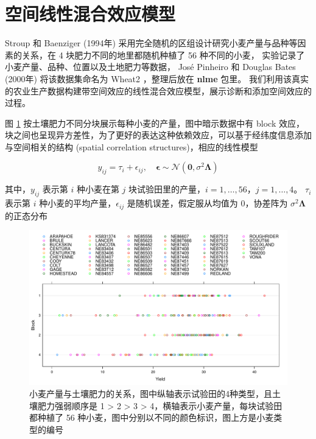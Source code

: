 \documentclass[12pt,a4paper,UTF8,twoside]{book}
\theoremstyle{definition}
\theoremstyle{definition}
\theoremstyle{definition}
\theoremstyle{remark}
\begin{document}
\hypertarget{sptial-random-effects}{%
\section{空间线性混合效应模型}\label{sptial-random-effects}}

Stroup 和 Baenziger (1994年) \citep{Stroup1994}
采用完全随机的区组设计研究小麦产量与品种等因素的关系，在 4
块肥力不同的地里都随机种植了 56 种不同的小麦，
实验记录了小麦产量、品种、位置以及土地肥力等数据， José Pinheiro 和
Douglas Bates (2000年) \citep{Pinheiro2000} 将该数据集命名为 Wheat2
，整理后放在 \textbf{nlme} 包里。
我们利用该真实的农业生产数据构建带空间效应的线性混合效应模型，展示诊断和添加空间效应的过程。

图 \ref{fig:yields-block}
按土壤肥力不同分块展示每种小麦的产量，图中暗示数据中有 block
效应，块之间也呈现异方差性，为了更好的表达这种依赖效应，可以基于经纬度信息添加与空间相关的结构
(spatial correlation structures)，相应的线性模型

\begin{equation}
y_{ij} = \tau_i + \epsilon_{ij}, \quad \boldsymbol{\epsilon} \sim \mathcal{N}(\mathbf{0},\sigma^2 \boldsymbol{\Lambda}) \label{eq:extended-linear-model}
\end{equation}

其中，\(y_{ij}\) 表示第 \(i\) 种小麦在第 \(j\)
块试验田里的产量，\(i = 1,\ldots,56\)，\(j = 1,\ldots,4\)。 \(\tau_i\)
表示第 \(i\) 种小麦的平均产量，\(\epsilon_{ij}\)
是随机误差，假定服从均值为 0，协差阵为 \(\sigma^2 \boldsymbol{\Lambda}\)
的正态分布

\begin{figure}

{\centering \includegraphics[width=0.9\linewidth]{figures/Yields-Block} 

}

\caption{小麦产量与土壤肥力的关系，图中纵轴表示试验田的4种类型，且土壤肥力强弱顺序是 1 > 2 > 3 > 4，横轴表示小麦产量，每块试验田都种植了 56 种小麦，图中分别以不同的颜色标识，图上方是小麦类型的编号}\label{fig:yields-block}
\end{figure}
\end{document}
